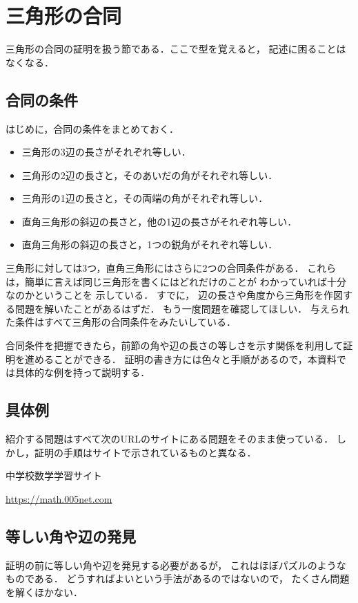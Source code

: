\documentclass[dvipdfmx]{jsarticle}
\begin{document}
	\section{三角形の合同}
	三角形の合同の証明を扱う節である．ここで型を覚えると，
	記述に困ることはなくなる．
	\subsection{合同の条件}
	はじめに，合同の条件をまとめておく．
	\begin{itemize}
		\item 三角形の3辺の長さがそれぞれ等しい．
		\item 三角形の2辺の長さと，そのあいだの角がそれぞれ等しい．
		\item 三角形の1辺の長さと，その両端の角がそれぞれ等しい．
		\item 直角三角形の斜辺の長さと，他の1辺の長さがそれぞれ等しい．
		\item 直角三角形の斜辺の長さと，1つの鋭角がそれぞれ等しい．
	\end{itemize}
	三角形に対しては3つ，直角三角形にはさらに2つの合同条件がある．
	これらは，簡単に言えば同じ三角形を書くにはどれだけのことが
	わかっていれば十分なのかということを
	示している．
	すでに，
	辺の長さや角度から三角形を作図する問題を解いたことがあるはずだ．
	もう一度問題を確認してほしい．
	与えられた条件はすべて三角形の合同条件をみたいしている．

	合同条件を把握できたら，前節の角や辺の長さの等しさを示す関係を利用して証明を進めることができる．
	証明の書き方には色々と手順があるので，本資料では具体的な例を持って説明する．

	\subsection{具体例}
	紹介する問題はすべて次のURLのサイトにある問題をそのまま使っている．
	しかし，証明の手順はサイトで示されているものと異なる．

	\begin{center}
		中学校数学学習サイト

		\url{https://math.005net.com}
	\end{center}


	\subsection{等しい角や辺の発見}
	証明の前に等しい角や辺を発見する必要があるが，
	これはほぼパズルのようなものである．
	どうすればよいという手法があるのではないので，
	たくさん問題を解くほかない．
	
\end{document}
